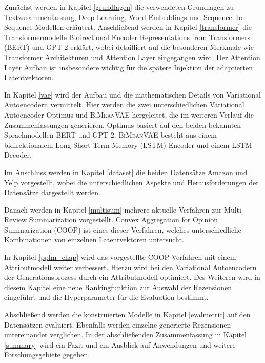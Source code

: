 Zunächst werden in Kapitel \ref{grundlagen} die verwendeten Grundlagen zu Textzusammenfassung, Deep Learning, Word Embeddings und Sequence-To-Sequence Modellen erläutert.
Anschließend werden in Kapitel \ref{transformer} die Transformermodelle Bidirectional Encoder Representations from Transformers (BERT) und GPT-2 erklärt, wobei detailliert auf die besonderen Merkmale wie Transformer Architekturen und Attention Layer eingegangen wird.
Der Attention Layer Aufbau ist insbesondere wichtig für die spätere Injektion der adaptierten Latentvektoren.

In Kapitel \ref{vae} wird der Aufbau und die mathematischen Details von Variational Autoencodern vermittelt.
Hier werden die zwei unterschiedlichen Variational Autoencoder Optimus und \textsc{BiMeanVAE} hergeleitet, die im weiteren Verlauf die Zusammenfassungen generieren.
Optimus basiert auf den beiden bekannten Sprachmodellen BERT und GPT-2. 
\textsc{BiMeanVAE} besteht aus einem bidirektionalem Long Short Term Memory (LSTM)-Encoder und einem LSTM-Decoder.

Im Anschluss werden in Kapitel \ref{dataset} die beiden Datensätze Amazon und Yelp vorgestellt, wobei die unterschiedlichen Aspekte und Herausforderungen der Datensätze dargestellt werden.

Danach werden in Kapitel \ref{multisum} mehrere aktuelle Verfahren zur Multi-Review Summarization vorgestellt. 
Convex Aggregation for Opinion Summarization (COOP) ist eines dieser Verfahren, welches unterschiedliche Kombinationen von einzelnen Latentvektoren untersucht.

In Kapitel \ref{pplm_chap} wird das vorgestellte COOP Verfahren mit einem Attributmodell weiter verbessert. 
Hierzu wird bei den Variational Autoencodern der Generationsprozess durch ein Attributmodell optimiert.
Des Weiteren wird in diesem Kapitel eine neue Rankingfunktion zur Auswahl der Rezensionen eingeführt und die Hyperparameter für die Evaluation bestimmt.

Abschließend werden die konstruierten Modelle in Kapitel \ref{evalmetric} auf den Datensätzen evaluiert. Ebenfalls werden einzelne generierte Rezensionen untereinander verglichen.
In der abschließenden Zusammenfassung in Kapitel \ref{summary} wird ein Fazit und ein Ausblick auf Anwendungen und weitere Forschungsgebiete gegeben.  






